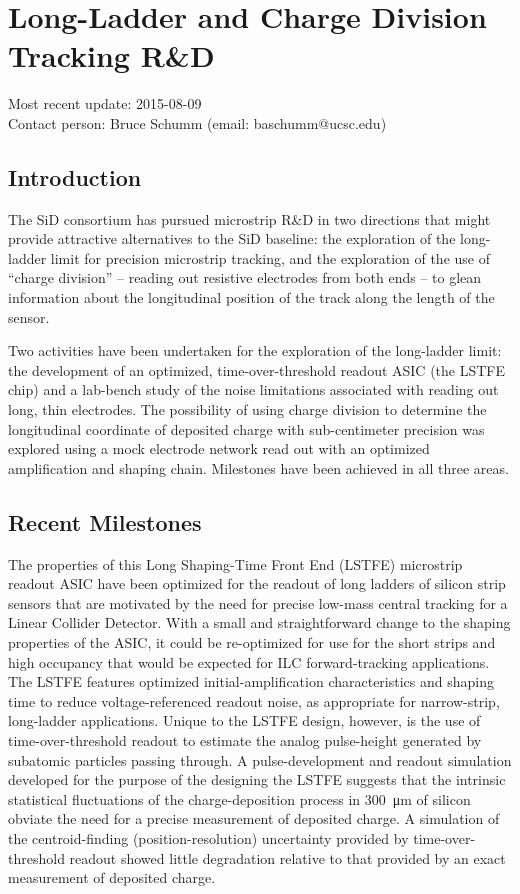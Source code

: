 
\section{Long-Ladder and Charge Division Tracking R\&D}
Most recent update: 2015-08-09 \\
Contact person: Bruce Schumm (email: baschumm@ucsc.edu)
\subsection{Introduction}

The SiD consortium has pursued microstrip R\&D in two directions that might provide attractive
alternatives to the SiD baseline: the exploration of the long-ladder limit for precision
microstrip tracking, and the exploration of the use of ``charge division'' -- reading out
resistive electrodes from both ends --
to glean information about the longitudinal position of the track
along the length of the sensor.

Two activities have been undertaken for the exploration of the long-ladder limit:
the development of an optimized, time-over-threshold readout ASIC (the LSTFE chip)
and a lab-bench study of the noise limitations associated with reading out long,
thin electrodes.
The possibility of using charge division to determine the longitudinal
coordinate of deposited charge with sub-centimeter precision was explored
using a mock electrode network read out with an optimized amplification and
shaping chain. Milestones have been achieved in all three areas.

\subsection{Recent Milestones}

The properties of this Long Shaping-Time Front End (LSTFE) microstrip readout ASIC have
been optimized for the readout of long ladders of silicon strip sensors that are motivated
by the need for precise low-mass central tracking for a Linear Collider Detector. With a
small and straightforward change to the shaping properties of the ASIC, it could be re-optimized
for use for the short strips and high occupancy that would be expected for ILC forward-tracking applications.
The LSTFE features optimized initial-amplification characteristics
and shaping time to reduce voltage-referenced readout noise, as appropriate for narrow-strip, long-ladder
applications. Unique to the LSTFE design, however, is the use of time-over-threshold readout to estimate the
analog pulse-height generated by subatomic particles passing through. A pulse-development and readout simulation developed
for the purpose of the designing the LSTFE suggests that the intrinsic statistical fluctuations of the
charge-deposition process in \SI{300}{\micro\meter} of silicon obviate the need for a precise measurement
of deposited charge. A simulation of the centroid-finding (position-resolution) uncertainty provided by
time-over-threshold readout showed little degradation relative to that provided by an exact measurement of
deposited charge.

